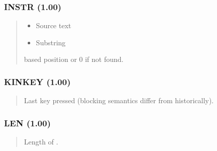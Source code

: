 \documentclass[letterpaper,10pt,english]{sphinxmanual}
\begin{document}
\subsubsection{INSTR (1.00)}
\label{\detokenize{ppl:instr-1-00}}\begin{quote}

\sphinxAtStartPar
{}
\begin{description}
\begin{itemize}
\item {} 
\sphinxAtStartPar
{} \textendash{} Source text

\item {} 
\sphinxAtStartPar
{} \textendash{} Substring

\end{itemize}

\sphinxhyphen{}based position or 0 if not found.

\end{description}
\end{quote}


\subsubsection{KINKEY (1.00)}
\label{\detokenize{ppl:kinkey-1-00}}\begin{quote}

\sphinxAtStartPar
{}
\begin{description}
\sphinxAtStartPar
Last key pressed (blocking semantics differ from  historically).

\end{description}
\end{quote}


\subsubsection{LEN (1.00)}
\label{\detokenize{ppl:len-1-00}}\begin{quote}

\sphinxAtStartPar
{}
\begin{description}
\sphinxAtStartPar
Length of .

\end{description}
\end{quote}
\end{document}
